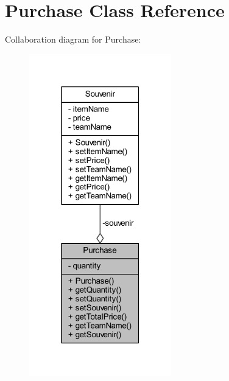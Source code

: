 \hypertarget{class_purchase}{}\section{Purchase Class Reference}
\label{class_purchase}


Collaboration diagram for Purchase\+:
\nopagebreak
\begin{figure}[H]
\begin{center}
\leavevmode
\includegraphics[width=175pt]{class_purchase__coll__graph}
\end{center}
\end{figure}
